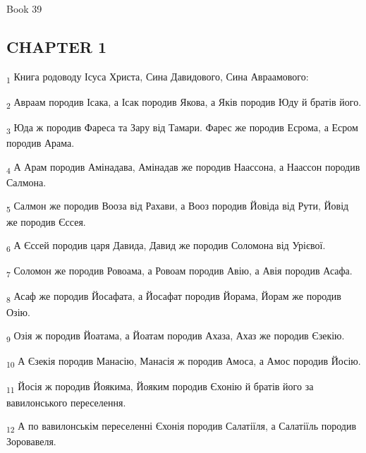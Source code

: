 Book 39
\subsection{CHAPTER 1}
\begin{tcolorbox}
\textsubscript{1} Книга родоводу Ісуса Христа, Сина Давидового, Сина Авраамового:
\end{tcolorbox}
\begin{tcolorbox}
\textsubscript{2} Авраам породив Ісака, а Ісак породив Якова, а Яків породив Юду й братів його.
\end{tcolorbox}
\begin{tcolorbox}
\textsubscript{3} Юда ж породив Фареса та Зару від Тамари. Фарес же породив Есрома, а Есром породив Арама.
\end{tcolorbox}
\begin{tcolorbox}
\textsubscript{4} А Арам породив Амінадава, Амінадав же породив Наассона, а Наассон породив Салмона.
\end{tcolorbox}
\begin{tcolorbox}
\textsubscript{5} Салмон же породив Вооза від Рахави, а Вооз породив Йовіда від Рути, Йовід же породив Єссея.
\end{tcolorbox}
\begin{tcolorbox}
\textsubscript{6} А Єссей породив царя Давида, Давид же породив Соломона від Урієвої.
\end{tcolorbox}
\begin{tcolorbox}
\textsubscript{7} Соломон же породив Ровоама, а Ровоам породив Авію, а Авія породив Асафа.
\end{tcolorbox}
\begin{tcolorbox}
\textsubscript{8} Асаф же породив Йосафата, а Йосафат породив Йорама, Йорам же породив Озію.
\end{tcolorbox}
\begin{tcolorbox}
\textsubscript{9} Озія ж породив Йоатама, а Йоатам породив Ахаза, Ахаз же породив Єзекію.
\end{tcolorbox}
\begin{tcolorbox}
\textsubscript{10} А Єзекія породив Манасію, Манасія ж породив Амоса, а Амос породив Йосію.
\end{tcolorbox}
\begin{tcolorbox}
\textsubscript{11} Йосія ж породив Йоякима, Йояким породив Єхонію й братів його за вавилонського переселення.
\end{tcolorbox}
\begin{tcolorbox}
\textsubscript{12} А по вавилонськім переселенні Єхонія породив Салатіїля, а Салатіїль породив Зоровавеля.
\end{tcolorbox}
